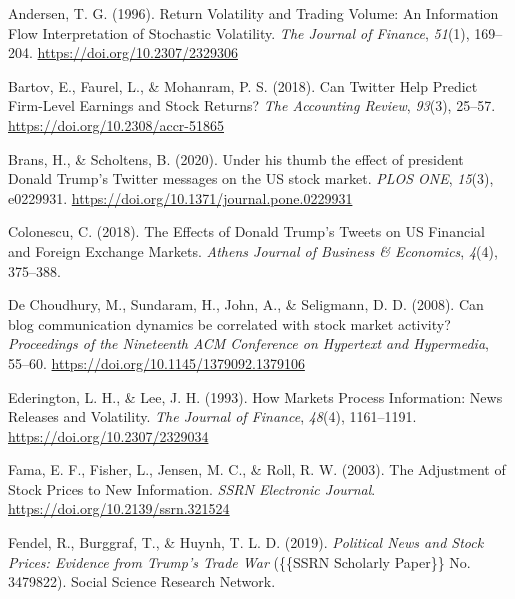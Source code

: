 \documentclass[
]{article}
\newlength{\cslhangindent}
\newenvironment{CSLReferences}[2] %
 {\begin{list}{}{%
  \setlength{\itemindent}{0pt}
  \setlength{\leftmargin}{0pt}
  \setlength{\parsep}{0pt}
  \ifodd #1
   \setlength{\leftmargin}{\cslhangindent}
   \setlength{\itemindent}{-1\cslhangindent}
  \fi
  \setlength{\itemsep}{#2\baselineskip}}}
 {\end{list}}
\begin{document}
\clearpage

\label{refs}
\begin{CSLReferences}{1}{0}
Andersen, T. G. (1996). Return {Volatility} and {Trading Volume}: {An Information Flow Interpretation} of {Stochastic Volatility}. \emph{The Journal of Finance}, \emph{51}(1), 169--204. \url{https://doi.org/10.2307/2329306}

Bartov, E., Faurel, L., \& Mohanram, P. S. (2018). Can {Twitter Help Predict Firm-Level Earnings} and {Stock Returns}? \emph{The Accounting Review}, \emph{93}(3), 25--57. \url{https://doi.org/10.2308/accr-51865}

Brans, H., \& Scholtens, B. (2020). Under his thumb the effect of president {Donald Trump}'s {Twitter} messages on the {US} stock market. \emph{PLOS ONE}, \emph{15}(3), e0229931. \url{https://doi.org/10.1371/journal.pone.0229931}

Colonescu, C. (2018). The {Effects} of {Donald Trump}'s {Tweets} on {US Financial} and {Foreign Exchange Markets}. \emph{Athens Journal of Business \& Economics}, \emph{4}(4), 375--388.

De Choudhury, M., Sundaram, H., John, A., \& Seligmann, D. D. (2008). Can blog communication dynamics be correlated with stock market activity? \emph{Proceedings of the Nineteenth {ACM} Conference on {Hypertext} and Hypermedia}, 55--60. \url{https://doi.org/10.1145/1379092.1379106}

Ederington, L. H., \& Lee, J. H. (1993). How {Markets Process Information}: {News Releases} and {Volatility}. \emph{The Journal of Finance}, \emph{48}(4), 1161--1191. \url{https://doi.org/10.2307/2329034}

Fama, E. F., Fisher, L., Jensen, M. C., \& Roll, R. W. (2003). The {Adjustment} of {Stock Prices} to {New Information}. \emph{SSRN Electronic Journal}. \url{https://doi.org/10.2139/ssrn.321524}

Fendel, R., Burggraf, T., \& Huynh, T. L. D. (2019). \emph{Political {News} and {Stock Prices}: {Evidence} from {Trump}'s {Trade War}} (\{\{SSRN Scholarly Paper\}\} No. 3479822). Social Science Research Network.


\end{CSLReferences}
\end{document}
